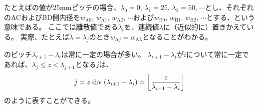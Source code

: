 \begin{hosoku}[label=hosoku:example4taper]
たとえば\IDTaperTable の値が25mmピッチの場合、$\lambda_0=0$, $\lambda_1=25$, $\lambda_2=50$, $\cdots$とし、それぞれのACおよびBD側内径を$w_{\mathrm A0}$, $w_{\mathrm A1}$, $w_{\mathrm A2}$, $\cdots$および$w_{\mathrm B0}$, $w_{\mathrm B1}$, $w_{\mathrm B2}$, $\cdots$とする、という意味である。
ここでは離散値である$\lambda_i$を、連続値$\lambda$に（近似的に）置きかえている。
実際、たとえば$\lambda = \lambda_j$のとき$w_{\mathrm Aj} = w_{\mathrm A\lambda}$となることがわかる。
\end{hosoku}\relax
\begin{hosoku}
\IDTaperTable のピッチ$\lambda_{i+1}-\lambda_i$は常に一定の場合が多い。
$\lambda_{i+1}-\lambda_i$が$i$について常に一定であれば、$\lambda_j \leq z < \lambda_{j+1}$となる$j$は、
\begin{align*}
  j = z \bDiv (\lambda_{i+1}-\lambda_i) = \left\lfloor\frac z{\lambda_{i+1}-\lambda_i}\right\rfloor
\end{align*}
のように表すことができる。
\end{hosoku}
\vfill
